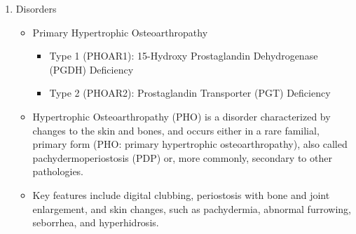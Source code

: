 \documentclass{scrartcl}
\begin{document}
\begin{enumerate}
\item Disorders
\label{sec:org38a9c4b}
\begin{itemize}
\item Primary Hypertrophic Osteoarthropathy
\begin{itemize}
\item Type 1 (PHOAR1): 15-Hydroxy Prostaglandin Dehydrogenase (PGDH) Deficiency
\item Type 2 (PHOAR2): Prostaglandin Transporter (PGT) Deficiency
\end{itemize}

\item Hypertrophic Osteoarthropathy (PHO) is a disorder characterized by
changes to the skin and bones, and occurs either in a rare
familial, primary form (PHO: primary hypertrophic
osteoarthropathy), also called pachydermoperiostosis (PDP) or, more
commonly, secondary to other pathologies.

\item Key features include digital clubbing, periostosis with bone and
joint enlargement, and skin changes, such as pachydermia, abnormal
furrowing, seborrhea, and hyperhidrosis.
\end{itemize}
\end{enumerate}
\end{document}

